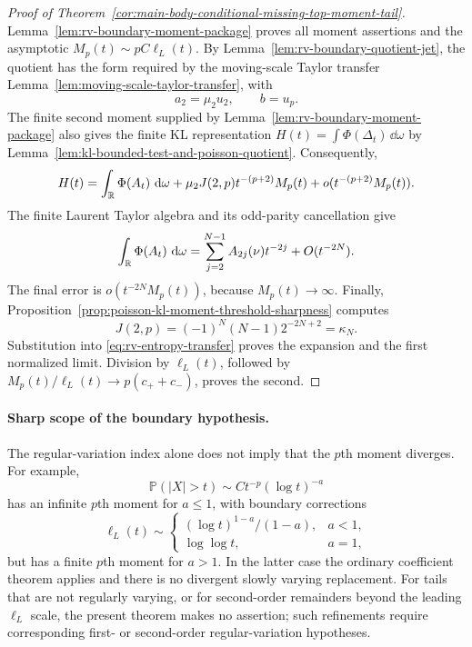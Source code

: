 \begin{proof}[Proof of
Theorem~\ref{cor:main-body-conditional-missing-top-moment-tail}]
Lemma~\ref{lem:rv-boundary-moment-package} proves all moment assertions and
the asymptotic \(M_p(t)\sim pC\ell_L(t)\).  By
Lemma~\ref{lem:rv-boundary-quotient-jet}, the quotient has the form required
by the moving-scale Taylor transfer
Lemma~\ref{lem:moving-scale-taylor-transfer}, with
\[
 a_2=\mu_2u_2,\qquad b=u_p.
\]
The finite second moment supplied by
Lemma~\ref{lem:rv-boundary-moment-package} also gives the finite KL
representation \(H(t)=\int\Phi(\Delta_t)\,\dd\omega\) by
Lemma~\ref{lem:kl-bounded-test-and-poisson-quotient}.  Consequently,
\begin{equation}\label{eq:rv-entropy-transfer}
 H(t)=\int_{\mathbb{R}}\Phi(A_t)\,\,\mathrm{d}\omega
 +\mu_2J(2,p)t^{-(p+2)}M_p(t)
 +o(t^{-(p+2)}M_p(t)).
\end{equation}
The finite Laurent Taylor algebra and its odd-parity cancellation give
\[
 \int_{\mathbb{R}}\Phi(A_t)\,\,\mathrm{d}\omega
 =\sum_{j=2}^{N-1}A_{2j}(\nu)t^{-2j}+O(t^{-2N}).
\]
The final error is
\(o(t^{-2N}M_p(t))\), because \(M_p(t)\to\infty\).  Finally,
Proposition~\ref{prop:poisson-kl-moment-threshold-sharpness} computes
\[
 J(2,p)=(-1)^N(N-1)2^{-2N+2}=\kappa_N.
\]
Substitution into \eqref{eq:rv-entropy-transfer} proves the expansion and
the first normalized limit.  Division by
\(\ell_L(t)\), followed by
\(M_p(t)/\ell_L(t)\to p(c_++c_-)\), proves the second.
\end{proof}

\paragraph{Sharp scope of the boundary hypothesis.}
The regular-variation index alone does not imply that the \(p\)th moment
diverges.  For example,
\[
 \mathbb P(|X|>t)\sim Ct^{-p}(\log t)^{-a}
\]
has an infinite \(p\)th moment for \(a\le1\), with boundary corrections
\[
 \ell_L(t)\sim
 \begin{cases}
 (\log t)^{1-a}/(1-a),&a<1,\\
 \log\log t,&a=1,
 \end{cases}
\]
but has a finite \(p\)th moment for \(a>1\).  In the latter case the
ordinary coefficient theorem applies and there is no divergent
slowly varying replacement.  For tails that are not regularly varying, or
for second-order remainders beyond the leading \(\ell_L\) scale, the
present theorem makes no assertion; such refinements require corresponding
first- or second-order regular-variation hypotheses.

